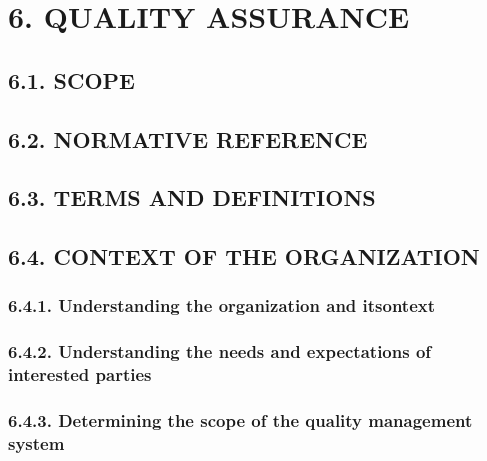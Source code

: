 \documentclass[
]{article}
\begin{document}
\hypertarget{quality-assurance-1}{%
\section{6. QUALITY ASSURANCE}\label{quality-assurance-1}}

\hypertarget{scope-1}{%
\subsection{6.1. SCOPE}\label{scope-1}}

\hypertarget{normative-reference-1}{%
\subsection{6.2. NORMATIVE REFERENCE}\label{normative-reference-1}}

\hypertarget{terms-and-definitions-1}{%
\subsection{6.3. TERMS AND DEFINITIONS}\label{terms-and-definitions-1}}

\hypertarget{context-of-the-organization-1}{%
\subsection{6.4. CONTEXT OF THE
ORGANIZATION}\label{context-of-the-organization-1}}

\hypertarget{understanding-the-organization-and-itsontext-1}{%
\subsubsection{6.4.1. Understanding the organization and
itsontext}\label{understanding-the-organization-and-itsontext-1}}

\hypertarget{understanding-the-needs-and-expectations-of-interested-parties-1}{%
\subsubsection{6.4.2. Understanding the needs and expectations of
interested
parties}\label{understanding-the-needs-and-expectations-of-interested-parties-1}}

\hypertarget{determining-the-scope-of-the-quality-management-system-1}{%
\subsubsection{6.4.3. Determining the scope of the quality management
system}\label{determining-the-scope-of-the-quality-management-system-1}}
\end{document}
